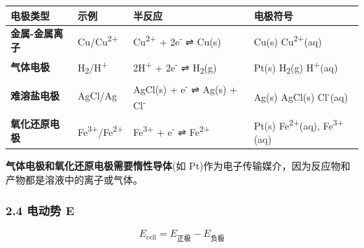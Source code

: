 {\def\LTcaptype{none} %
\begin{longtable}[]{@{}
  >{\raggedright\arraybackslash}p{}
  >{\raggedright\arraybackslash}p{}
  >{\raggedright\arraybackslash}p{}
  >{\raggedright\arraybackslash}p{}@{}}
\toprule\noalign{}
\begin{minipage}[b]{\linewidth}\raggedright
电极类型
\end{minipage} & \begin{minipage}[b]{\linewidth}\raggedright
示例
\end{minipage} & \begin{minipage}[b]{\linewidth}\raggedright
半反应
\end{minipage} & \begin{minipage}[b]{\linewidth}\raggedright
电极符号
\end{minipage} \\
\midrule\noalign{}
\endhead
\bottomrule\noalign{}
\endlastfoot
\textbf{金属-金属离子} & Cu/Cu\textsuperscript{2+} & Cu\textsuperscript{2+} + 2e\textsuperscript{-} ⇌ Cu(s) & Cu(s) \textbar{} Cu\textsuperscript{2+}(aq) \\
\textbf{气体电极} & H\textsubscript{2}/H\textsuperscript{+} & 2H\textsuperscript{+} + 2e\textsuperscript{-} ⇌ H\textsubscript{2}(g) & Pt(s) \textbar{} H\textsubscript{2}(g) \textbar{} H\textsuperscript{+}(aq) \\
\textbf{难溶盐电极} & AgCl/Ag & AgCl(s) + e\textsuperscript{-} ⇌ Ag(s) + Cl\textsuperscript{-} & Ag(s) \textbar{} AgCl(s) \textbar{} Cl\textsuperscript{-}(aq) \\
\textbf{氧化还原电极} & Fe\textsuperscript{3+}/Fe\textsuperscript{2+} & Fe\textsuperscript{3+} + e\textsuperscript{-} ⇌ Fe\textsuperscript{2+} & Pt(s) \textbar{} Fe\textsuperscript{2+}(aq), Fe\textsuperscript{3+}(aq) \\
\end{longtable}
}

\textbf{气体电极和氧化还原电极需要惰性导体}(如 Pt)作为电子传输媒介，因为反应物和产物都是溶液中的离子或气体。

\subsubsection{2.4 电动势 E}\label{ux7535ux52a8ux52bf-e}

\[
E_{\text{cell}} = E_{\text{正极}} - E_{\text{负极}}
\]

